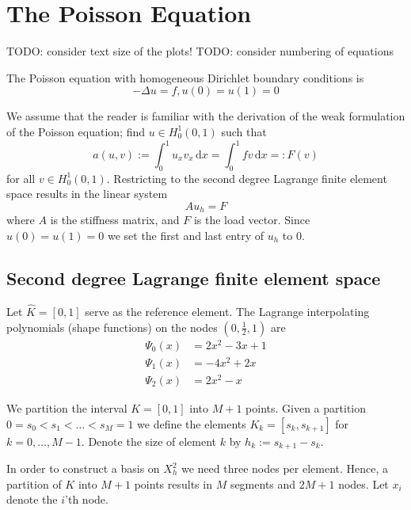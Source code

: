 \section{The Poisson Equation}

TODO: consider text size of the plots!
TODO: consider numbering of equations

The Poisson equation with homogeneous Dirichlet boundary conditions is
\begin{equation}
    - \Delta u = f, u(0) = u(1) = 0
\end{equation}

We assume that the reader is familiar with the
derivation of the weak formulation of the Poisson equation;
find \( u \in H_0^1(0, 1) \) such that
\begin{equation}
  \label{eq:weak}
    a(u, v) := \int_{0}^{1}u_x v_x \,\mathrm{d}x = \int_{0}^{1}f v \,\mathrm{d}x =: F(v)
\end{equation}
for all \( v \in H^1_0 (0,1)\).
Restricting to the second degree Lagrange finite element space
results in the linear system
\begin{equation}
    Au_h = F
\end{equation}
where \( A \) is the stiffness matrix,
and \( F \) is the load vector.
Since \( u(0) = u(1) = 0 \) we set
the first and last entry of \( u_h \)
to \( 0 \).

\subsection{Second degree Lagrange finite element space}\label{sec:sec}

Let \( \hat{K} = [0, 1] \) serve as the reference element.
The Lagrange interpolating polynomials (shape functions)
on the nodes \( (0, \frac{1}{2}, 1) \) are
\begin{align}
  \Psi_0(x) &= 2x^2 - 3x + 1\\
  \Psi_1(x) &= -4x^2 + 2x\\
  \Psi_2(x) &= 2x^2 - x
\end{align}

We partition the interval \( K = [0, 1] \) into \( M + 1 \) points.
Given a partition \( 0 = s_0 < s_1 < \dots < s_M = 1  \)
we define the elements \( K_k = [s_{k}, s_{k+1}] \) for $k = 0, \dots, M-1$.
Denote the size of element \( k \) by \( h_k := s_{k+1} - s_{k} \).

In order to construct a basis on \( X_h^2 \) we need three
nodes per element.
Hence, a partition of \( K \) into \( M + 1 \) points
results in \( M \) segments and \( 2M + 1 \) nodes.
Let \( x_i \) denote the \( i \)'th node.

